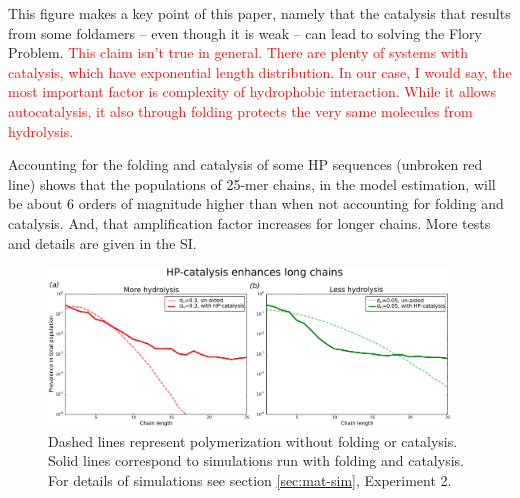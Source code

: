 \documentclass[journal=jacsat,manuscript=article,layout=twocolumn]{achemso}
\newcommand*{\red}[1]{\textcolor{red}{#1}}
\begin{document}
This figure makes a key point of this paper, namely that the catalysis that 
results from some foldamers -- even though it is weak -- can lead to solving the Flory Problem. 
\red{This claim isn't true in general. There are plenty of systems with catalysis, which have 
exponential length distribution. In our case, I would say, the most important factor is 
complexity of hydrophobic interaction. While it allows autocatalysis, it also through folding 
protects the very same molecules from hydrolysis.}

Accounting for the folding and catalysis of some HP sequences (unbroken red line) shows that the 
populations of 25-mer chains, in the model estimation, will be about 6 orders of magnitude higher 
than when not accounting for folding and catalysis.  And, that amplification factor increases for 
longer chains.  
More tests and details are given in the SI.
\begin{figure}[h!]
  \centering
  \includegraphics[width=0.95\textwidth]{pictures/flory-and-hp.pdf} 
  \caption{Dashed lines represent polymerization without folding or catalysis. Solid lines 
correspond to simulations run with folding and catalysis. For details of simulations see 
section \ref{sec:mat-sim}, Experiment 2. }
  \label{fig:sim.flory-fold}
\end{figure}
\end{document}
